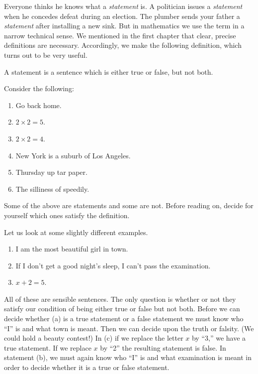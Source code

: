 \documentclass[11pt]{book}
\begin{document}
Everyone thinks he knows what a \emph{statement} is. A politician issues a
\emph{statement} when he concedes defeat during an election. The plumber sends
your father a \emph{statement} after installing a new sink. But in mathematics we
use the term in a narrow technical sense. We mentioned in the first chapter that
clear, precise definitions are necessary. Accordingly, we make the following
definition, which turns out to be very useful.

\begin{definition}
A statement is a sentence which is either true or false, but not both.
\end{definition}

Consider the following:

\begin{enumerate}[label=(\alph*), leftmargin=2.2em, itemsep=1pt, topsep=3pt]
\item Go back home.
\item $2 \times 2 = 5$.
\item $2 \times 2 = 4$.
\item New York is a suburb of Los Angeles.
\item Thursday up tar paper.
\item The silliness of speedily.
\end{enumerate}

Some of the above are statements and some are not. Before reading on, decide for
yourself which ones satisfy the definition.

Let us look at some slightly different examples.

\begin{enumerate}[label=(\alph*), leftmargin=2.2em, itemsep=1pt, topsep=3pt]
\item I am the most beautiful girl in town.
\item If I don't get a good night's sleep, I can't pass the examination.
\item $x + 2 = 5$.
\end{enumerate}

All of these are sensible sentences. The only question is whether or not they
satisfy our condition of being either true or false but not both. Before we can
decide whether (a) is a true statement or a false statement we must know who
``I'' is and what town is meant. Then we can decide upon the truth or falsity.
(We could hold a beauty contest!) In (c) if we replace the letter $x$ by ``3,''
we have a true statement. If we replace $x$ by ``2'' the resulting statement is
false. In statement (b), we must again know who ``I'' is and what examination is
meant in order to decide whether it is a true or false statement.
\end{document}
